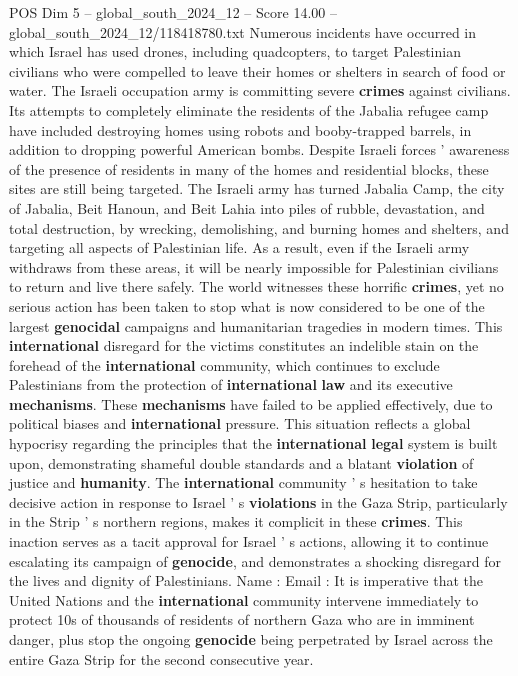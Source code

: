 \begin{textsample}{POS Dim 5 – global\_south\_2024\_12 – Score 14.00 – global\_south\_2024\_12/118418780.txt}
Numerous incidents have occurred in which Israel has used drones, including quadcopters, to target Palestinian civilians who were compelled to leave their homes or shelters in search of food or water.
The Israeli occupation army is committing severe \textbf{crimes} against civilians.
Its attempts to completely eliminate the residents of the Jabalia refugee camp have included destroying homes using robots and booby-trapped barrels, in addition to dropping powerful American bombs.
Despite Israeli forces ' awareness of the presence of residents in many of the homes and residential blocks, these sites are still being targeted.
The Israeli army has turned Jabalia Camp, the city of Jabalia, Beit Hanoun, and Beit Lahia into piles of rubble, devastation, and total destruction, by wrecking, demolishing, and burning homes and shelters, and targeting all aspects of Palestinian life.
As a result, even if the Israeli army withdraws from these areas, it will be nearly impossible for Palestinian civilians to return and live there safely.
The world witnesses these horrific \textbf{crimes}, yet no serious action has been taken to stop what is now considered to be one of the largest \textbf{genocidal} campaigns and humanitarian tragedies in modern times.
This \textbf{international} disregard for the victims constitutes an indelible stain on the forehead of the \textbf{international} community, which continues to exclude Palestinians from the protection of \textbf{international} \textbf{law} and its executive \textbf{mechanisms}.
These \textbf{mechanisms} have failed to be applied effectively, due to political biases and \textbf{international} pressure.
This situation reflects a global hypocrisy regarding the principles that the \textbf{international} \textbf{legal} system is built upon, demonstrating shameful double standards and a blatant \textbf{violation} of justice and \textbf{humanity}.
The \textbf{international} community ' s hesitation to take decisive action in response to Israel ' s \textbf{violations} in the Gaza Strip, particularly in the Strip ' s northern regions, makes it complicit in these \textbf{crimes}.
This inaction serves as a tacit approval for Israel ' s actions, allowing it to continue escalating its campaign of \textbf{genocide}, and demonstrates a shocking disregard for the lives and dignity of Palestinians.
Name : Email : It is imperative that the United Nations and the \textbf{international} community intervene immediately to protect 10s of thousands of residents of northern Gaza who are in imminent danger, plus stop the ongoing \textbf{genocide} being perpetrated by Israel across the entire Gaza Strip for the second consecutive year.

\end{textsample}

